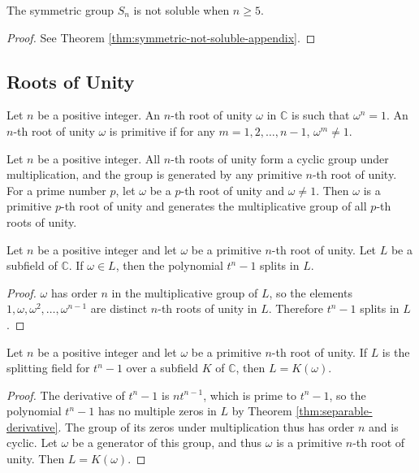 \begin{theorem} \label{thm:symmetric-not-soluble}
	The symmetric group $S_n$ is not soluble when $n \ge 5$. 
\end{theorem}
\begin{proof}
	See Theorem \ref{thm:symmetric-not-soluble-appendix}. 
\end{proof}


\subsection{Roots of Unity}


\begin{definition}
	Let $n$ be a positive integer. An $n$-th root of unity $\omega$ in $\mathbb C$ is such that $\omega ^ n = 1$. An $n$-th root of unity $\omega$ is primitive if for any $m = 1, 2, \dots, n - 1$, $\omega ^ m \neq 1$.
\end{definition}

\begin{observation}
	Let $n$ be a positive integer. All $n$-th roots of unity form a cyclic group under multiplication, and the group is generated by any primitive $n$-th root of unity. For a prime number $p$, let $\omega$ be a $p$-th root of unity and $\omega \neq 1$. Then $\omega$ is a primitive $p$-th root of unity and generates the multiplicative group of all $p$-th roots of unity.
\end{observation}

\begin{theorem} \label{thm:unity-1}
	Let $n$ be a positive integer and let $\omega$ be a primitive $n$-th root of unity. Let $L$ be a subfield of $\mathbb C$. If $\omega \in L$, then the polynomial $t^n - 1$ splits in $L$.
\end{theorem}
\begin{proof}
	$\omega$ has order $n$ in the multiplicative group of $L$, so the elements $1, \omega, \omega^2, \ldots, \omega^{n-1}$ are distinct $n$-th roots of unity in $L$. Therefore $t^n-1$ splits in $L$.
\end{proof}

\begin{theorem} \label{thm:unity-2}
	Let $n$ be a positive integer and let $\omega$ be a primitive $n$-th root of unity. If $L$ is the splitting field for $t^n - 1$ over a subfield $K$ of $\mathbb C$, then $L = K(\omega)$.
\end{theorem}

\begin{proof}
	The derivative of $t^n-1$ is $n t^{n-1}$, which is prime to $t^n-1$, so the polynomial $t^n-1$ has no multiple zeros in $L$ by Theorem \ref{thm:separable-derivative}. The group of its zeros under multiplication thus has order $n$ and is cyclic. Let $\omega$ be a generator of this group, and thus $\omega$ is a primitive $n$-th root of unity. Then $L=K(\omega)$. 
\end{proof}




